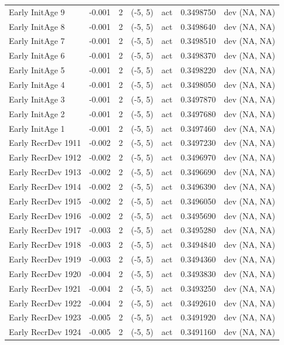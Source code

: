 \documentclass[11pt,
  english,
  a4paper,
]{article}
\begin{document}
\begin{landscape}
\begin{longtable}[t]{>{\raggedright\arraybackslash}p{7cm}lllll>{\raggedright\arraybackslash}p{4cm}}
Early InitAge 9 & -0.001 & 2 & (-5, 5) & act & 0.3498750 & dev (NA, NA)\\
Early InitAge 8 & -0.001 & 2 & (-5, 5) & act & 0.3498640 & dev (NA, NA)\\
Early InitAge 7 & -0.001 & 2 & (-5, 5) & act & 0.3498510 & dev (NA, NA)\\
Early InitAge 6 & -0.001 & 2 & (-5, 5) & act & 0.3498370 & dev (NA, NA)\\
Early InitAge 5 & -0.001 & 2 & (-5, 5) & act & 0.3498220 & dev (NA, NA)\\
Early InitAge 4 & -0.001 & 2 & (-5, 5) & act & 0.3498050 & dev (NA, NA)\\
Early InitAge 3 & -0.001 & 2 & (-5, 5) & act & 0.3497870 & dev (NA, NA)\\
Early InitAge 2 & -0.001 & 2 & (-5, 5) & act & 0.3497680 & dev (NA, NA)\\
Early InitAge 1 & -0.001 & 2 & (-5, 5) & act & 0.3497460 & dev (NA, NA)\\
Early RecrDev 1911 & -0.002 & 2 & (-5, 5) & act & 0.3497230 & dev (NA, NA)\\
Early RecrDev 1912 & -0.002 & 2 & (-5, 5) & act & 0.3496970 & dev (NA, NA)\\
Early RecrDev 1913 & -0.002 & 2 & (-5, 5) & act & 0.3496690 & dev (NA, NA)\\
Early RecrDev 1914 & -0.002 & 2 & (-5, 5) & act & 0.3496390 & dev (NA, NA)\\
Early RecrDev 1915 & -0.002 & 2 & (-5, 5) & act & 0.3496050 & dev (NA, NA)\\
Early RecrDev 1916 & -0.002 & 2 & (-5, 5) & act & 0.3495690 & dev (NA, NA)\\
Early RecrDev 1917 & -0.003 & 2 & (-5, 5) & act & 0.3495280 & dev (NA, NA)\\
Early RecrDev 1918 & -0.003 & 2 & (-5, 5) & act & 0.3494840 & dev (NA, NA)\\
Early RecrDev 1919 & -0.003 & 2 & (-5, 5) & act & 0.3494360 & dev (NA, NA)\\
Early RecrDev 1920 & -0.004 & 2 & (-5, 5) & act & 0.3493830 & dev (NA, NA)\\
Early RecrDev 1921 & -0.004 & 2 & (-5, 5) & act & 0.3493250 & dev (NA, NA)\\
Early RecrDev 1922 & -0.004 & 2 & (-5, 5) & act & 0.3492610 & dev (NA, NA)\\
Early RecrDev 1923 & -0.005 & 2 & (-5, 5) & act & 0.3491920 & dev (NA, NA)\\
Early RecrDev 1924 & -0.005 & 2 & (-5, 5) & act & 0.3491160 & dev (NA, NA)\\

\end{longtable}
\end{landscape}
\end{document}
